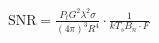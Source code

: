 \documentclass[preview]{standalone}
\begin{document}
\begin{align*}
\text{SNR} = \frac{P_t G^2 \lambda^2 \sigma}{(4 \pi)^3 R^4} \cdot \frac{1}{k T_s B_n \cdot F}
\end{align*}
\end{document}
